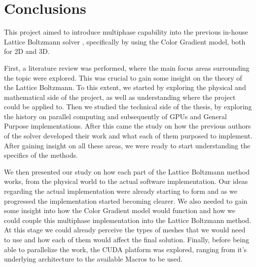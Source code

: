 \documentclass[12pt, openany]{book}
\begin{document}
\chapter{Conclusions}
This project aimed to introduce multiphase capability into the previous in-house Lattice Boltzmann solver \cite{maciej_thesis,koleszar_thesis,jozsa_thesis,szoke_thesis}, specifically by using the Color Gradient model, both for 2D and 3D. \par
First, a literature review was performed, where the main focus areas surrounding the topic were explored. This was crucial to gain some insight on the theory of the Lattice Boltzmann. To this extent, we started by exploring the physical and mathematical side of the project, as well as understanding where the project could be applied to. Then we studied the technical side of the thesis, by exploring the history on parallel computing and subsequently of GPUs and General Purpose implementations. After this came the study on how the previous authors of the solver developed their work and what each of them purposed to implement. After gaining insight on all these areas, we were ready to start understanding the specifics of the methods. \par
We then presented our study on how each part of the Lattice Boltzmann method works, from the physical world to the actual software implementation. Our ideas regarding the actual implementation were already starting to form and as we progressed the implementation started becoming clearer. We also needed to gain some insight into how the Color Gradient model would function and how we could couple this multiphase implementation into the Lattice Boltzmann method. At this stage we could already perceive the types of meshes that we would need to use and how each of them would affect the final solution. Finally, before being able to parallelize the work, the CUDA platform was explored, ranging from it's underlying architecture to the available Macros to be used. \par
\end{document}
